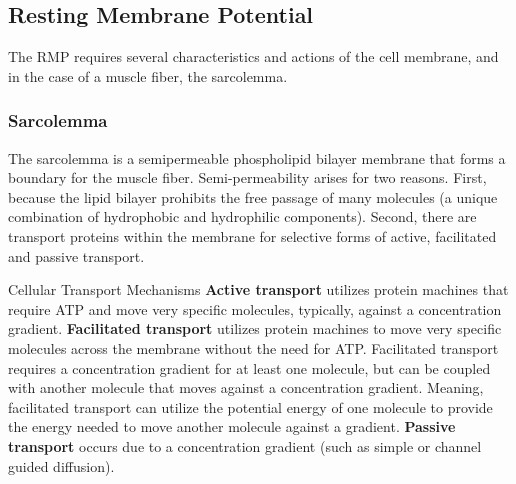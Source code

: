 \subsection{Resting Membrane Potential}

The RMP requires several characteristics and actions of the cell membrane, and in the case of a muscle fiber, the sarcolemma.

\subsubsection{Sarcolemma}


The sarcolemma is a semipermeable phospholipid bilayer membrane that forms a boundary for the muscle fiber. Semi-permeability arises for two reasons. First, because the lipid bilayer prohibits the free passage of many molecules (a unique combination of hydrophobic and hydrophilic components). Second, there are transport proteins within the membrane for selective forms of active, facilitated and passive transport.

\begin{backgroundinformation}{Cellular Transport Mechanisms}
\textbf{Active transport} utilizes protein machines that require ATP and move very specific molecules, typically, against a concentration gradient. \textbf{Facilitated transport} utilizes protein machines to move very specific molecules across the membrane without the need for ATP. Facilitated transport requires a concentration gradient for at least one molecule, but can be coupled with another molecule that moves against a concentration gradient. Meaning, facilitated transport can utilize the potential energy of one molecule to provide the energy needed to move another molecule against a gradient. \textbf{Passive transport} occurs due to a concentration gradient (such as simple or channel guided diffusion).
\end{backgroundinformation}

